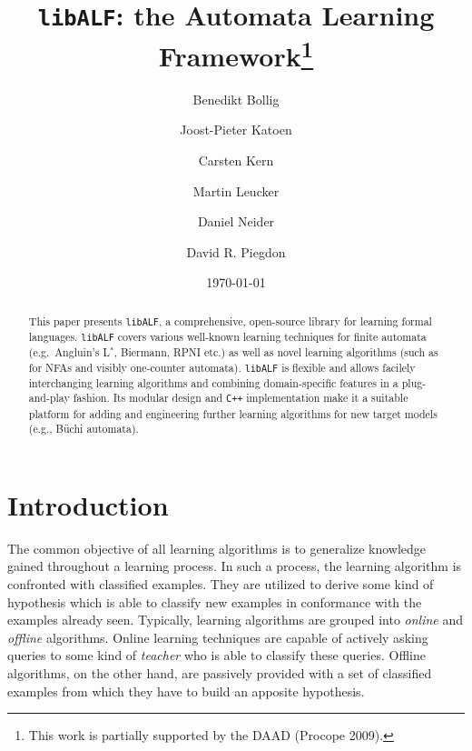 \documentclass[a4paper, fontsize=11pt, DIV=12, parskip=half]{scrartcl}
\newcommand{\libalf}{\texttt{libALF}\xspace}
\newcommand{\cpp}{\texttt{C+$\!$+}\xspace}
\newcommand{\lstar}{{\textsf{L}}$^\ast$\xspace}
\newcommand{\biermann}{\textsf{Biermann}\xspace}
\newcommand{\rpni}{\textsf{RPNI}\xspace}
\begin{document}
\pagestyle{fancyplain}
\thispagestyle{plain}


\title{\vspace{-1cm} \libalf: the Automata Learning Framework\thanks{This work is partially supported by the DAAD (Procope 2009).}}
\date{\today}
\author{Benedikt Bollig\and Joost-Pieter Katoen\and Carsten Kern\and Martin Leucker\and Daniel Neider\and David R. Piegdon}
\maketitle

\begin{abstract}
  This paper presents \libalf, a comprehensive, open-source library for
  learning formal languages. \libalf covers various well-known learning
  techniques for finite automata (e.g.\ Angluin's \lstar, \biermann, \rpni etc.)
  as well as novel learning algorithms (such as for NFAs and visibly one-counter
  automata). \libalf is flexible and allows 
  facilely interchanging learning algorithms and combining domain-specific
  features in a plug-and-play fashion.
  Its modular design and \cpp implementation make it a suitable platform
  for adding and engineering further learning algorithms for new
  target models (e.g., B\"uchi automata).
\end{abstract}

\section{Introduction}

The common objective of all learning algorithms is to generalize knowledge gained throughout a learning process. In such a process, the learning algorithm is confronted with classified examples. They are utilized to derive some kind of hypothesis which is able to classify new examples in conformance with the examples already seen. Typically, learning algorithms are grouped into \emph{online} and \emph{offline} algorithms. Online learning techniques are capable of actively asking queries to some kind of \emph{teacher} who is able to classify these queries. Offline algorithms, on the other hand, are passively provided with a set of classified examples from which they have to build an apposite hypothesis.
\end{document}
